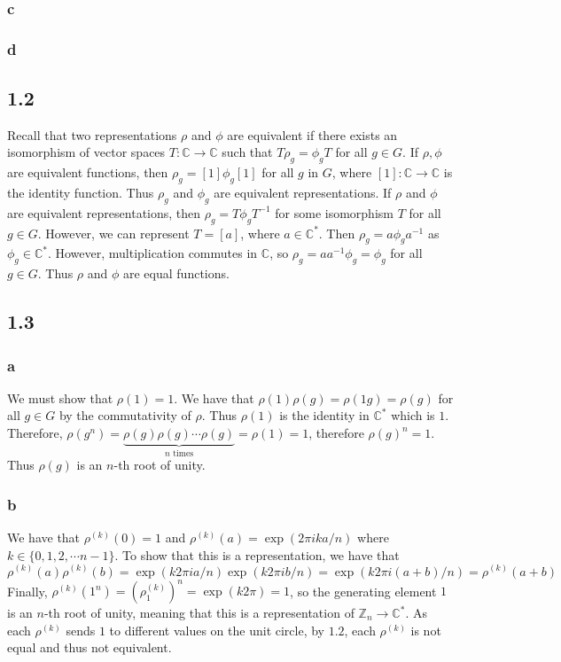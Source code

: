 \documentclass[]{article}
\begin{document}
\subsubsection*{c}

\subsubsection*{d}

\subsection*{1.2}
Recall that two representations $\rho$ and $\phi$ are equivalent if there exists an isomorphism of vector spaces $T: \mathbb{C} \rightarrow \mathbb{C}$ such that $T \rho_g = \phi_g T$ for all $g \in G$. 
If $\rho, \phi$ are equivalent functions, then $\rho_g = [1] \phi_g [1]$ for all $g$ in $G$, where $[1] : \mathbb{C} \rightarrow \mathbb{C}$ is the identity function. Thus $\rho_g$ and $\phi_g$ are equivalent representations.
If $\rho$ and $\phi$ are equivalent representations, then $\rho_g = T \phi_g T^{-1}$ for some isomorphism $T$ for all $g \in G$. However, we can represent $T = [a]$, where $ a \in \mathbb{C}^*$. Then $\rho_g = a \phi_g a^{-1}$ as $\phi_g \in \mathbb{C}^*$. However, multiplication commutes in $\mathbb{C}$, so $\rho_g = a a^{-1} \phi_g = \phi_g$ for all $g \in G$. Thus $\rho$ and $\phi$ are equal functions. 

\subsection{1.3}
\subsubsection*{a}
We must show that $\rho(1) = 1$. We have that $\rho(1) \rho(g) =\rho(1 g) =  \rho(g)$ for all $g \in G$ by the commutativity of $\rho$. Thus $\rho(1)$ is the identity in $\mathbb{C}^*$ which is $1$. Therefore, $\rho(g^n) = \underbrace{\rho(g) \rho(g) \cdots \rho(g)}_{n \text{ times}} = \rho(1) = 1$, therefore $\rho(g)^n = 1$. Thus $\rho(g)$ is an $n$-th root of unity. 
\subsubsection*{b}
We have that $\rho^{(k)}(0) = 1$ and $\rho^{(k)}(a) = \exp( 2\pi i ka/n)$ where $k \in \lbrace 0, 1, 2, \cdots n-1 \rbrace$.
To show that this is a representation, we have that 
\begin{equation}
	\rho^{(k)}(a) \rho^{(k)}(b)  = \exp(k 2\pi i a/n) \exp(k 2\pi i b/n) = \exp(k 2\pi i (a + b)/n) = \rho^{(k)}(a + b)
\end{equation}
Finally, $\rho^{(k)}(1^n)= (\rho^{(k)}_{1})^n = \exp(k 2 \pi) = 1$, so the generating element $1$ is an $n$-th root of unity, meaning that this is a representation of $\mathbb{Z}_n \rightarrow \mathbb{C}^*$.
As each $\rho^{(k)}$ sends $1$ to different values on the unit circle, by $1.2$, each $\rho^{(k)}$ is not equal and thus not equivalent. 
\end{document}
